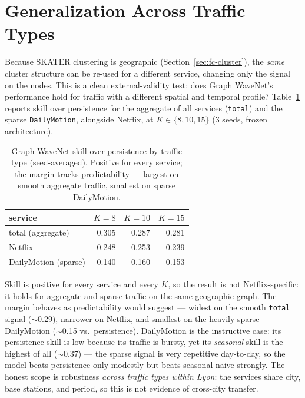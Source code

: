 \section{Generalization Across Traffic Types}
\label{sec:generalization}

Because SKATER clustering is geographic (Section~\ref{sec:fc-cluster}), the \emph{same} cluster structure can be re-used for a different
service, changing only the signal on the nodes. This is a clean external-validity test: does Graph WaveNet's
performance hold for traffic with a different spatial and temporal profile? Table~\ref{tab:fc-gen} reports
skill over persistence for the aggregate of all services (\texttt{total}) and the sparse \texttt{DailyMotion},
alongside Netflix, at $K\in\{8,10,15\}$ (3 seeds, frozen architecture).

\begin{table}[t]
\centering
\caption{Graph WaveNet skill over persistence by traffic type (seed-averaged). Positive for every service;
the margin tracks predictability --- largest on smooth aggregate traffic, smallest on sparse DailyMotion.}
\label{tab:fc-gen}
\begin{tabular}{lrrr}
\hline
service & $K{=}8$ & $K{=}10$ & $K{=}15$ \\
\hline
total (aggregate)   & 0.305 & 0.287 & 0.281 \\
Netflix             & 0.248 & 0.253 & 0.239 \\
DailyMotion (sparse)& 0.140 & 0.160 & 0.153 \\
\hline
\end{tabular}
\end{table}

Skill is positive for every service and every $K$, so the result is not Netflix-specific: it holds for
aggregate and sparse traffic on the same geographic graph. The margin behaves as predictability would
suggest --- widest on the smooth \texttt{total} signal ($\sim$0.29), narrower on Netflix, and smallest on
the heavily sparse DailyMotion ($\sim$0.15 vs.\ persistence). DailyMotion is the instructive case: its
persistence-skill is low because its traffic is bursty, yet its \emph{seasonal}-skill is the highest of all
($\sim$0.37) --- the sparse signal is very repetitive day-to-day, so the model beats persistence only
modestly but beats seasonal-naive strongly. The honest scope is robustness \emph{across traffic types within
Lyon}: the services share city, base stations, and period, so this is not evidence of cross-city transfer.

